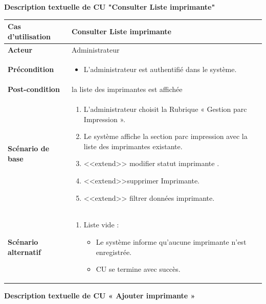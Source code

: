 \documentclass[a4paper,11pt]{report}
\begin{document}
\textbf{Description textuelle de CU "Consulter Liste imprimante"}

\begin{tabularx}{\textwidth}{|>{\bfseries}l|X|}
\hline
Cas d’utilisation    & Consulter Liste imprimante \\
\hline
Acteur               & Administrateur \\
\hline
Précondition         &
\begin{itemize}[left=0pt]
  \item L’administrateur est authentifié dans le système.
\end{itemize} \\
\hline
Post-condition       & la liste des imprimantes est affichée \\
\hline
Scénario de base     &
\begin{enumerate}[left=0pt]
  \item L’administrateur choisit la 	Rubrique « Gestion parc Impression ».
  \item Le système affiche la section parc impression avec la liste des imprimantes existante.
  \item <<extend>> modifier statut imprimante .
  \item <<extend>>supprimer Imprimante.
  \item <<extend>> filtrer données imprimante.

\end{enumerate} \\
\hline
Scénario alternatif   &
\begin{enumerate}[label=\arabic*.a,wide=0pt]
  \item[2.a] Liste vide :
    \begin{itemize}[left=1em]
      \item Le système informe qu’aucune imprimante n’est enregistrée.
      \item CU se termine avec succès.

    \end{itemize}
\end{enumerate} \\
\hline
\end{tabularx}


\newpage
\textbf{Description textuelle de CU « Ajouter imprimante »}
\end{document}
